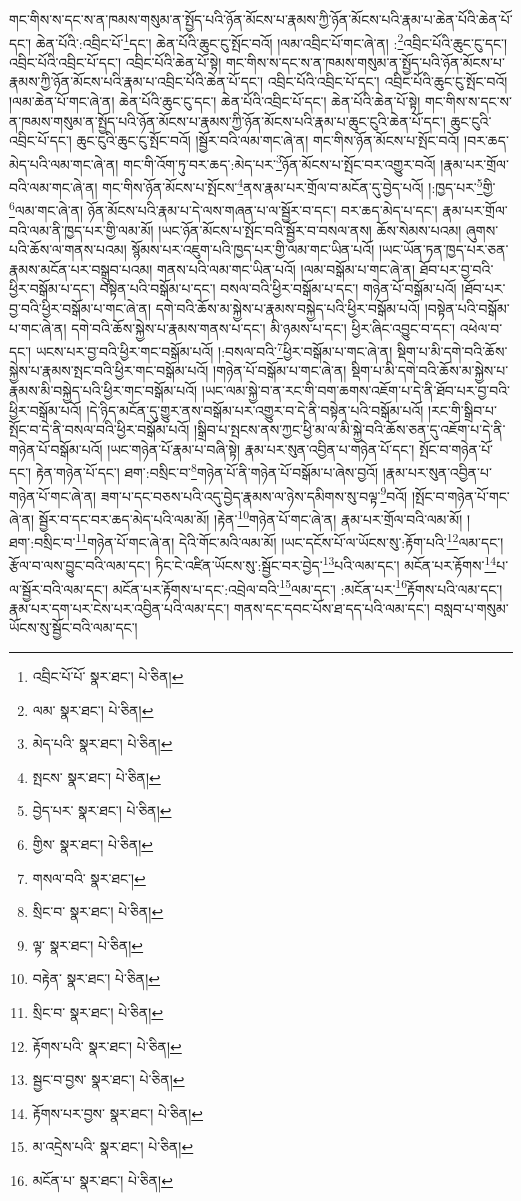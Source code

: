 གང་གིས་ས་དང་ས་ན་ཁམས་གསུམ་ན་སྤྱོད་པའི་ཉོན་མོངས་པ་རྣམས་ཀྱི་ཉོན་མོངས་པའི་རྣམ་པ་ཆེན་པོའི་ཆེན་པོ་དང་། ཆེན་པོའི་:འབྲིང་པོ་\footnote{འབྲིང་པོ་པོ་  སྣར་ཐང་།  པེ་ཅིན། }དང་། ཆེན་པོའི་ཆུང་ངུ་སྤོང་བའོ། །ལམ་འབྲིང་པོ་གང་ཞེ་ན། :\footnote{ལམ་  སྣར་ཐང་།  པེ་ཅིན། }འབྲིང་པོའི་ཆུང་ངུ་དང་། འབྲིང་པོའི་འབྲིང་པོ་དང་། འབྲིང་པོའི་ཆེན་པོ་སྟེ། གང་གིས་ས་དང་ས་ན་ཁམས་གསུམ་ན་སྤྱོད་པའི་ཉོན་མོངས་པ་རྣམས་ཀྱི་ཉོན་མོངས་པའི་རྣམ་པ་འབྲིང་པོའི་ཆེན་པོ་དང་། འབྲིང་པོའི་འབྲིང་པོ་དང་། འབྲིང་པོའི་ཆུང་ངུ་སྤོང་བའོ། །ལམ་ཆེན་པོ་གང་ཞེ་ན། ཆེན་པོའི་ཆུང་ངུ་དང་། ཆེན་པོའི་འབྲིང་པོ་དང་། ཆེན་པོའི་ཆེན་པོ་སྟེ། གང་གིས་ས་དང་ས་ན་ཁམས་གསུམ་ན་སྤྱོད་པའི་ཉོན་མོངས་པ་རྣམས་ཀྱི་ཉོན་མོངས་པའི་རྣམ་པ་ཆུང་ངུའི་ཆེན་པོ་དང་། ཆུང་ངུའི་འབྲིང་པོ་དང་། ཆུང་ངུའི་ཆུང་ངུ་སྤོང་བའོ། །སྦྱོར་བའི་ལམ་གང་ཞེ་ན། གང་གིས་ཉོན་མོངས་པ་སྤོང་བའོ། །བར་ཆད་མེད་པའི་ལམ་གང་ཞེ་ན། གང་གི་འོག་ཏུ་བར་ཆད་:མེད་པར་\footnote{མེད་པའི་  སྣར་ཐང་།  པེ་ཅིན། }ཉོན་མོངས་པ་སྤོང་བར་འགྱུར་བའོ། །རྣམ་པར་གྲོལ་བའི་ལམ་གང་ཞེ་ན། གང་གིས་ཉོན་མོངས་པ་སྤོངས་\footnote{སྤངས་  སྣར་ཐང་།  པེ་ཅིན། }ནས་རྣམ་པར་གྲོལ་བ་མངོན་དུ་བྱེད་པའོ། །:ཁྱད་པར་\footnote{བྱེད་པར་  སྣར་ཐང་།  པེ་ཅིན། }གྱི་\footnote{གྱིས་  སྣར་ཐང་།  པེ་ཅིན། }ལམ་གང་ཞེ་ན། ཉོན་མོངས་པའི་རྣམ་པ་དེ་ལས་གཞན་པ་ལ་སྦྱོར་བ་དང་། བར་ཆད་མེད་པ་དང་། རྣམ་པར་གྲོལ་བའི་ལམ་ནི་ཁྱད་པར་གྱི་ལམ་མོ། །ཡང་ཉོན་མོངས་པ་སྤོང་བའི་སྦྱོར་བ་བསལ་ནས། ཆོས་སེམས་པའམ། ཞུགས་པའི་ཆོས་ལ་གནས་པའམ། སྙོམས་པར་འཇུག་པའི་ཁྱད་པར་གྱི་ལམ་གང་ཡིན་པའོ། །ཡང་ཡོན་ཏན་ཁྱད་པར་ཅན་རྣམས་མངོན་པར་བསྒྲུབ་པའམ། གནས་པའི་ལམ་གང་ཡིན་པའོ། །ལམ་བསྒོམ་པ་གང་ཞེ་ན། ཐོབ་པར་བྱ་བའི་ཕྱིར་བསྒོམ་པ་དང་། བསྟེན་པའི་བསྒོམ་པ་དང་། བསལ་བའི་ཕྱིར་བསྒོམ་པ་དང་། གཉེན་པོ་བསྒོམ་པའོ། །ཐོབ་པར་བྱ་བའི་ཕྱིར་བསྒོམ་པ་གང་ཞེ་ན། དགེ་བའི་ཆོས་མ་སྐྱེས་པ་རྣམས་བསྐྱེད་པའི་ཕྱིར་བསྒོམ་པའོ། །བསྟེན་པའི་བསྒོམ་པ་གང་ཞེ་ན། དགེ་བའི་ཆོས་སྐྱེས་པ་རྣམས་གནས་པ་དང་། མི་ཉམས་པ་དང་། ཕྱིར་ཞིང་འབྱུང་བ་དང་། འཕེལ་བ་དང་། ཡངས་པར་བྱ་བའི་ཕྱིར་གང་བསྒོམ་པའོ། །:བསལ་བའི་\footnote{གསལ་བའི་  སྣར་ཐང་། }ཕྱིར་བསྒོམ་པ་གང་ཞེ་ན། སྡིག་པ་མི་དགེ་བའི་ཆོས་སྐྱེས་པ་རྣམས་སྤང་བའི་ཕྱིར་གང་བསྒོམ་པའོ། །གཉེན་པོ་བསྒོམ་པ་གང་ཞེ་ན། སྡིག་པ་མི་དགེ་བའི་ཆོས་མ་སྐྱེས་པ་རྣམས་མི་བསྐྱེད་པའི་ཕྱིར་གང་བསྒོམ་པའོ། །ཡང་ལམ་སྐྱེ་བ་ན་རང་གི་བག་ཆགས་འཇོག་པ་དེ་ནི་ཐོབ་པར་བྱ་བའི་ཕྱིར་བསྒོམ་པའོ། །དེ་ཉིད་མངོན་དུ་གྱུར་ནས་བསྒོམ་པར་འགྱུར་བ་དེ་ནི་བསྟེན་པའི་བསྒོམ་པའོ། །རང་གི་སྒྲིབ་པ་སྤོང་བ་དེ་ནི་བསལ་བའི་ཕྱིར་བསྒོམ་པའོ། །སྒྲིབ་པ་སྤངས་ནས་ཀྱང་ཕྱི་མ་ལ་མི་སྐྱེ་བའི་ཆོས་ཅན་དུ་འཇོག་པ་དེ་ནི་གཉེན་པོ་བསྒོམ་པའོ། །ཡང་གཉེན་པོ་རྣམ་པ་བཞི་སྟེ། རྣམ་པར་སུན་འབྱིན་པ་གཉེན་པོ་དང་། སྤོང་བ་གཉེན་པོ་དང་། རྟེན་གཉེན་པོ་དང་། ཐག་:བསྲིང་བ་\footnote{སྲིང་བ་  སྣར་ཐང་།  པེ་ཅིན། }གཉེན་པོ་ནི་གཉེན་པོ་བསྒོམ་པ་ཞེས་བྱའོ། །རྣམ་པར་སུན་འབྱིན་པ་གཉེན་པོ་གང་ཞེ་ན། ཟག་པ་དང་བཅས་པའི་འདུ་བྱེད་རྣམས་ལ་ཉེས་དམིགས་སུ་བལྟ་\footnote{ལྟ་  སྣར་ཐང་།  པེ་ཅིན། }བའོ། །སྤོང་བ་གཉེན་པོ་གང་ཞེ་ན། སྦྱོར་བ་དང་བར་ཆད་མེད་པའི་ལམ་མོ། །རྟེན་\footnote{བརྟེན་  སྣར་ཐང་།  པེ་ཅིན། }གཉེན་པོ་གང་ཞེ་ན། རྣམ་པར་གྲོལ་བའི་ལམ་མོ། །ཐག་:བསྲིང་བ་\footnote{སྲིང་བ་  སྣར་ཐང་།  པེ་ཅིན། }གཉེན་པོ་གང་ཞེ་ན། དེའི་གོང་མའི་ལམ་མོ། །ཡང་དངོས་པོ་ལ་ཡོངས་སུ་:རྟོག་པའི་\footnote{རྟོགས་པའི་  སྣར་ཐང་།  པེ་ཅིན། }ལམ་དང་། རྩོལ་བ་ལས་བྱུང་བའི་ལམ་དང་། ཏིང་ངེ་འཛིན་ཡོངས་སུ་:སྦྱོང་བར་བྱེད་\footnote{སྦྱང་བ་བྱས་  སྣར་ཐང་།  པེ་ཅིན། }པའི་ལམ་དང་། མངོན་པར་རྟོགས་\footnote{རྟོགས་པར་བྱས་  སྣར་ཐང་།  པེ་ཅིན། }པ་ལ་སྦྱོར་བའི་ལམ་དང་། མངོན་པར་རྟོགས་པ་དང་:འབྲེལ་བའི་\footnote{མ་འདྲེས་པའི་  སྣར་ཐང་།  པེ་ཅིན། }ལམ་དང་། :མངོན་པར་\footnote{མངོན་པ་  སྣར་ཐང་།  པེ་ཅིན། }རྟོགས་པའི་ལམ་དང་། རྣམ་པར་དག་པར་ངེས་པར་འབྱིན་པའི་ལམ་དང་། གནས་དང་དབང་པོས་ཐ་དད་པའི་ལམ་དང་། བསླབ་པ་གསུམ་ཡོངས་སུ་སྦྱོང་བའི་ལམ་དང་། 